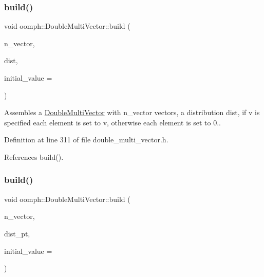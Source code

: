 \mbox{\label{classoomph_1_1DoubleMultiVector_a77d4b7b0d647f08995f6197843608fc2}} 
\subsubsection{\texorpdfstring{build()}{build()}\hspace{0.1cm}{\footnotesize\ttfamily [2/3]}}
{\footnotesize\ttfamily void oomph\+::\+Double\+Multi\+Vector\+::build (\begin{DoxyParamCaption}\item[{const unsigned \&}]{n\+\_\+vector,  }\item[{const \hyperlink{classoomph_1_1LinearAlgebraDistribution}{Linear\+Algebra\+Distribution} \&}]{dist,  }\item[{const double \&}]{initial\+\_\+value = {} }\end{DoxyParamCaption})\hspace{0.3cm}{\ttfamily [inline]}}



Assembles a \hyperlink{classoomph_1_1DoubleMultiVector}{Double\+Multi\+Vector} with n\+\_\+vector vectors, a distribution dist, if v is specified each element is set to v, otherwise each element is set to 0.. 



Definition at line 311 of file double\+\_\+multi\+\_\+vector.\+h.



References build().

\mbox{\label{classoomph_1_1DoubleMultiVector_a38714b8e2c119a373b34eb8b616a1c09}} 
\subsubsection{\texorpdfstring{build()}{build()}\hspace{0.1cm}{\footnotesize\ttfamily [3/3]}}
{\footnotesize\ttfamily void oomph\+::\+Double\+Multi\+Vector\+::build (\begin{DoxyParamCaption}\item[{const unsigned \&}]{n\+\_\+vector,  }\item[{const \hyperlink{classoomph_1_1LinearAlgebraDistribution}{Linear\+Algebra\+Distribution} $\ast$const \&}]{dist\+\_\+pt,  }\item[{const double \&}]{initial\+\_\+value = {} }\end{DoxyParamCaption})\hspace{0.3cm}{\ttfamily [inline]}}



